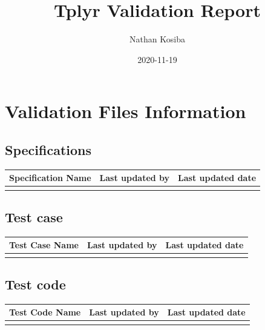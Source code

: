 \documentclass[
]{article}
\title{Tplyr Validation Report}
\author{Nathan Kosiba}
\date{2020-11-19}
\begin{document}
\maketitle

\newpage
\tableofcontents
\newpage

\hypertarget{validation-files-information}{%
\section{Validation Files
Information}\label{validation-files-information}}

\hypertarget{specifications}{%
\subsection{Specifications}\label{specifications}}

\begin{table}[H]
\centering
\begin{tabular}{lll}
\toprule
Specification Name & Last updated by & Last updated date\\
\midrule
\cellcolor{gray!6}{specification.Rmd} & \cellcolor{gray!6}{Nathan Kosiba} & \cellcolor{gray!6}{2020-11-05}\\
\bottomrule
\end{tabular}
\end{table}

\hypertarget{test-case}{%
\subsection{Test case}\label{test-case}}

\begin{table}[H]
\centering
\begin{tabular}{lll}
\toprule
Test Case Name & Last updated by & Last updated date\\
\midrule
\cellcolor{gray!6}{test\_cases.Rmd} & \cellcolor{gray!6}{Nathan Kosiba} & \cellcolor{gray!6}{2020-11-05}\\
\bottomrule
\end{tabular}
\end{table}

\hypertarget{test-code}{%
\subsection{Test code}\label{test-code}}

\begin{table}[H]
\centering
\begin{tabular}{lll}
\toprule
Test Code Name & Last updated by & Last updated date\\
\midrule
\cellcolor{gray!6}{test\_cases.R} & \cellcolor{gray!6}{Nathan Kosiba} & \cellcolor{gray!6}{2020-11-19}\\
\bottomrule
\end{tabular}
\end{table}
\end{document}
